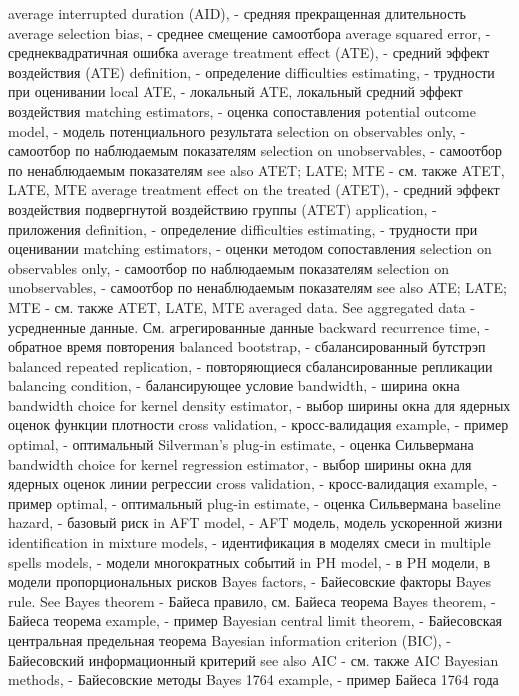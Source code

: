 average interrupted duration (AID), - средняя прекращенная длительность
average selection bias, - среднее смещение самоотбора
average squared error, - среднеквадратичная ошибка
average treatment effect (ATE), - средний эффект воздействия (ATE)
definition, - определение
difficulties estimating, - трудности при оценивании
local ATE, - локальный ATE, локальный средний эффект воздействия
matching estimators, - оценка сопоставления 
potential outcome model, - модель потенциального результата
selection on observables only, - самоотбор по наблюдаемым показателям
selection on unobservables, - самоотбор по ненаблюдаемым показателям
see also ATET; LATE; MTE - см. также ATET, LATE, MTE
average treatment effect on the treated (ATET), - средний эффект воздействия подвергнутой воздействию группы (ATET)
application, - приложения
definition, - определение
difficulties estimating, - трудности при оценивании
matching estimators, - оценки методом сопоставления 
selection on observables only, - самоотбор по наблюдаемым показателям
selection on unobservables, - самоотбор по ненаблюдаемым показателям
see also ATE; LATE; MTE - см. также ATET, LATE, MTE
averaged data. See aggregated data - усредненные данные. См. агрегированные данные
backward recurrence time, - обратное время повторения
balanced bootstrap, - сбалансированный бутстрэп
balanced repeated replication, - повторяющиеся сбалансированные репликации
balancing condition, - балансирующее условие
bandwidth, - ширина окна
bandwidth choice for kernel density estimator, - выбор ширины окна для ядерных оценок функции плотности
cross validation, - кросс-валидация
example, - пример
optimal, - оптимальный
Silverman’s plug-in estimate, - оценка Сильвермана
bandwidth choice for kernel regression estimator, - выбор ширины окна для ядерных оценок линии регрессии
cross validation, - кросс-валидация 
example, - пример 
optimal, - оптимальный 
plug-in estimate, - оценка Сильвермана
baseline hazard, - базовый риск
in AFT model, - AFT модель, модель ускоренной жизни
identification in mixture models, - идентификация в моделях смеси
in multiple spells models, - модели многократных событий
in PH model, - в PH модели, в модели пропорциональных рисков
Bayes factors, - Байесовские факторы
Bayes rule. See Bayes theorem - Байеса правило, см. Байеса теорема
Bayes theorem, - Байеса теорема 
example, - пример
Bayesian central limit theorem, - Байесовская центральная предельная теорема
Bayesian information criterion (BIC), - Байесовский информационный критерий
see also AIC - см. также AIC
Bayesian methods, - Байесовские методы
Bayes 1764 example, - пример Байеса 1764 года
